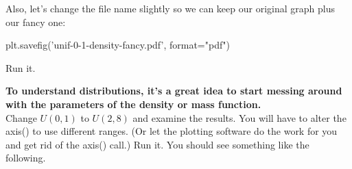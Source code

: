 \begin{fullwidth}
\step Also, let's change the file name slightly so we can keep our original graph plus our fancy one:

\begin{pyverbatim}
plt.savefig('unif-0-1-density-fancy.pdf', format="pdf")
\end{pyverbatim}

\step Run it. \\


{\bf To understand distributions, it's a great idea to start messing around with the parameters of the density or mass function.} \\

\step Change $U(0,1)$ to $U(2,8)$ and examine the results. You will have to alter the axis() to use different ranges. (Or let the plotting software do the work for you and get rid of the axis() call.) Run it. You should see something like the following.



\end{fullwidth}
